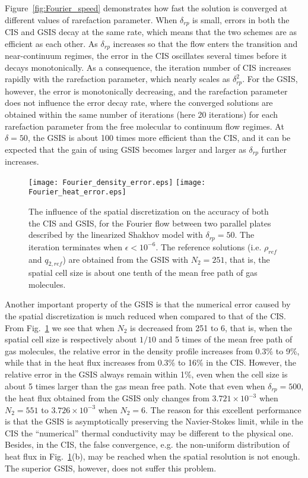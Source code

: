Figure~\ref{fig:Fourier_speed} demonstrates how fast the solution is converged at different values of rarefaction parameter. When $\delta_{rp}$ is small, errors in both the CIS and GSIS decay at the same rate, which means that the two schemes are as efficient as each other. As $\delta_{rp}$ increases so that the flow enters the transition and near-continuum regimes, the error in the CIS oscillates several times before it decays monotonically. As a consequence, the iteration number of CIS increases rapidly with the rarefaction parameter, which nearly scales as $\delta_{rp}^2$. For the GSIS, however, the error is monotonically decreasing, and the rarefaction parameter does not influence the error decay rate, where the converged solutions are obtained within the same number of iterations (here 20 iterations) for each rarefaction parameter from the free molecular to continuum flow regimes. At $\delta=50$, the GSIS is about 100 times more efficient than the CIS, and it can be expected that the gain of using GSIS becomes larger and larger as $\delta_{rp}$ further increases.



\begin{figure}[t]
	\centering
	\texttt{[image: Fourier\_density\_error.eps]}
	\texttt{[image: Fourier\_heat\_error.eps]}
	\caption{The influence of the spatial discretization on the accuracy of both the CIS and GSIS, for the Fourier flow between two parallel plates described by the linearized Shakhov model with $\delta_{rp}=50$. The iteration terminates when $\epsilon<10^{-6}$. The reference solutions (i.e. $\rho_{ref}$ and $q_{2,ref}$) are obtained from the GSIS with $N_2=251$, that is, the spatial cell size is about one tenth of the mean free path of gas molecules.}
	\label{fig:Fourier_spatial_error}
\end{figure}


Another important property of the GSIS is that the numerical error caused by the spatial discretization is much reduced when compared to that of the CIS.  From Fig.~\ref{fig:Fourier_spatial_error} we see that when $N_2$ is decreased from 251 to 6, that is, when the spatial cell size is respectively about $1/10$ and 5 times of the mean free path of gas molecules, the relative error in the density profile increases from 0.3\% to 9\%, while that in the heat flux increases from 0.3\% to 16\% in the CIS. However, the relative error in the GSIS always remain within 1\%, even when the cell size is about 5 times larger than the gas mean free path. Note that even when $\delta_{rp}=500$, the heat flux obtained from the GSIS only changes from $3.721\times10^{-3}$ when $N_2=551$ to $3.726\times10^{-3}$ when $N_2=6$. The reason for this excellent performance is that the GSIS is asymptotically preserving the Navier-Stokes limit, while in the CIS the ``numerical'' thermal conductivity may be different to the physical one. Besides, in the CIS, the false convergence, e.g. the non-uniform distribution of heat flux in Fig.~\ref{fig:Fourier_spatial_error}(b), may be reached when the spatial resolution is not enough. The superior GSIS,  however, does not suffer this problem.


